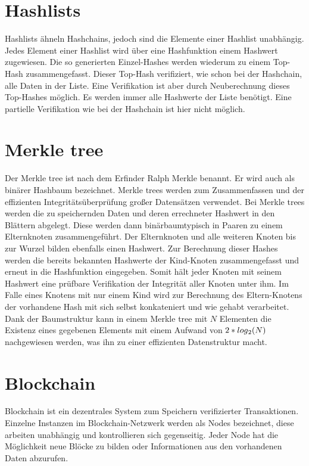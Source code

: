 \section{Hashlists}
Hashlists ähneln Hashchains, jedoch sind die Elemente einer Hashlist unabhängig. Jedes Element einer Hashlist wird über eine Hashfunktion einem Hashwert zugewiesen. Die so generierten Einzel-Hashes werden wiederum zu einem Top-Hash zusammengefasst. Dieser Top-Hash verifiziert, wie schon bei der Hashchain, alle Daten in der Liste. Eine Verifikation ist aber durch Neuberechnung dieses Top-Hashes möglich. Es werden immer alle Hashwerte der Liste benötigt. Eine partielle Verifikation wie bei der Hashchain ist hier nicht möglich.\cite[S.18f]{326652}

\section{Merkle tree}
Der Merkle tree ist nach dem Erfinder Ralph Merkle benannt. Er wird auch als binärer Hashbaum bezeichnet. Merkle trees werden zum Zusammenfassen und der effizienten Integritätsüberprüfung großer Datensätzen verwendet. Bei Merkle trees werden die zu speichernden Daten und deren errechneter Hashwert in den Blättern abgelegt. Diese werden dann binärbaumtypisch in Paaren zu einem Elternknoten zusammengeführt. Der Elternknoten und alle weiteren Knoten bis zur Wurzel bilden ebenfalls einen Hashwert. Zur Berechnung dieser Hashes werden die bereits bekannten Hashwerte der Kind-Knoten zusammengefasst und erneut in die Hashfunktion eingegeben. Somit hält jeder Knoten mit seinem Hashwert eine prüfbare Verifikation der Integrität aller Knoten unter ihm. Im Falle eines Knotens mit nur einem Kind wird zur Berechnung des Eltern-Knotens der vorhandene Hash mit sich selbst konkateniert und wie gehabt verarbeitet. Dank der Baumstruktur kann in einem Merkle tree mit $N$ Elementen die Existenz eines gegebenen Elements mit einem Aufwand von $2 * log\textsubscript{2}(N)$ nachgewiesen werden, was ihn zu einer effizienten Datenstruktur macht.

\section{Blockchain}
Blockchain ist ein dezentrales System zum Speichern verifizierter Transaktionen. Einzelne Instanzen im Blockchain-Netzwerk werden als Nodes bezeichnet, diese arbeiten unabhängig und kontrollieren sich gegenseitig. Jeder Node hat die Möglichkeit neue Blöcke zu bilden oder Informationen aus den vorhandenen Daten abzurufen.\cite[S.197ff]{5841204}

